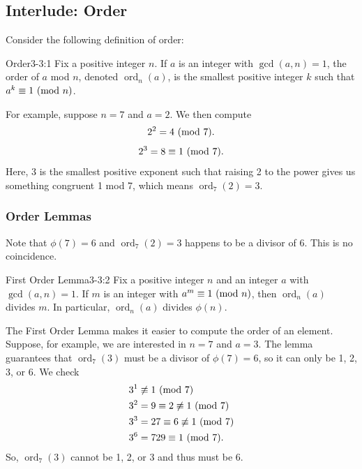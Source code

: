 \documentclass[letterpaper]{article}
\DeclareMathOperator{\ord}{ord}
\begin{document}
\subsection{Interlude: Order}
Consider the following definition of order: 
\begin{definition}{Order}{3-3:1}
    Fix a positive integer $n$. If $a$ is an integer with $\gcd(a, n) = 1$, the order of $a$ mod $n$, denoted $\ord_{n}(a)$, is the smallest positive integer $k$ such that $a^k \equiv 1 \ (\mathrm{mod}\ n)$.
\end{definition}
For example, suppose $n = 7$ and $a = 2$. We then compute 
\[2^2 = 4 \ (\mathrm{mod}\ 7).\]
\[2^3 = 8 \equiv 1 \ (\mathrm{mod}\ 7).\]
Here, 3 is the smallest positive exponent such that raising 2 to the power gives us something congruent 1 mod 7, which means $\ord_{7}(2) = 3$.

\subsubsection{Order Lemmas}
Note that $\phi(7) = 6$ and $\ord_{7}(2) = 3$ happens to be a divisor of 6. This is no coincidence. 

\begin{lemma}{First Order Lemma}{3-3:2}
    Fix a positive integer $n$ and an integer $a$ with $\gcd(a, n) = 1$. If $m$ is an integer with $a^m \equiv 1 \ (\mathrm{mod}\ n)$, then $\ord_{n}(a)$ divides $m$. In particular, $\ord_{n}(a)$ divides $\phi(n)$. 
\end{lemma}
The First Order Lemma makes it easier to compute the order of an element. Suppose, for example, we are interested in $n = 7$ and $a = 3$. The lemma guarantees that $\ord_{7}(3)$ must be a divisor of $\phi(7) = 6$, so it can only be 1, 2, 3, or 6. We check
\begin{equation*}
    \begin{aligned}
        &3^1 \not\equiv 1 \ (\mathrm{mod}\ 7) \\ 
        &3^2 = 9 \equiv 2 \not\equiv 1 \ (\mathrm{mod}\ 7) \\ 
        &3^3 = 27 \equiv 6 \not\equiv 1 \ (\mathrm{mod}\ 7) \\ 
        &3^6 = 729 \equiv 1 \ (\mathrm{mod}\ 7).
    \end{aligned}
\end{equation*}
So, $\ord_{7}(3)$ cannot be 1, 2, or 3 and thus must be 6.
\end{document}
